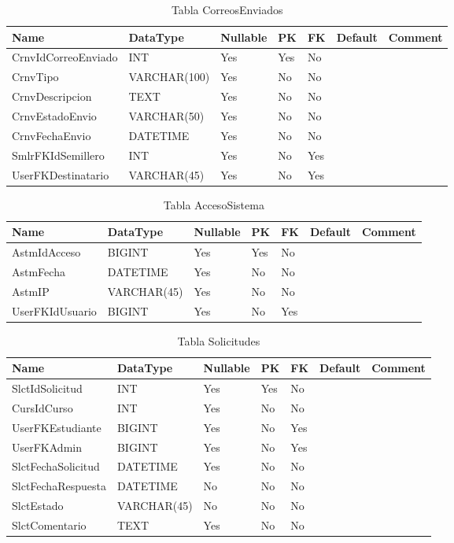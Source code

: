 \begin{table}
	\caption{Tabla CorreosEnviados}
	\label{labelTableCorreosEnviados}
	\begin{tabular}{ |l|l|l|l|l|l|l| }
		\hline
		Name & DataType & Nullable & PK & FK & Default & Comment \\ \hline
		CrnvIdCorreoEnviado & INT & Yes & Yes & No &  & \\ \hline 
		CrnvTipo & VARCHAR(100) & Yes & No & No &  & \\ \hline 
		CrnvDescripcion & TEXT & Yes & No & No &  & \\ \hline 
		CrnvEstadoEnvio & VARCHAR(50) & Yes & No & No &  & \\ \hline 
		CrnvFechaEnvio & DATETIME & Yes & No & No &  & \\ \hline 
		SmlrFKIdSemillero & INT & Yes & No & Yes &  & \\ \hline 
		UserFKDestinatario & VARCHAR(45) & Yes & No & Yes &  & \\ \hline 
		
	\end{tabular}
\end{table}


\begin{table}
	\caption{Tabla AccesoSistema}
	\label{labelTableAccesoSistema}
	\begin{tabular}{ |l|l|l|l|l|l|l| }
		\hline
		Name & DataType & Nullable & PK & FK & Default & Comment \\ \hline
		AstmIdAcceso & BIGINT & Yes & Yes & No &  & \\ \hline 
		AstmFecha & DATETIME & Yes & No & No &  & \\ \hline 
		AstmIP & VARCHAR(45) & Yes & No & No &  & \\ \hline 
		UserFKIdUsuario & BIGINT & Yes & No & Yes &  & \\ \hline 
		
	\end{tabular}
\end{table}


\begin{table}
	\caption{Tabla Solicitudes}
	\label{labelTableSolicitudes}
	\begin{tabular}{ |l|l|l|l|l|l|l| }
		\hline
		Name & DataType & Nullable & PK & FK & Default & Comment \\ \hline
		SlctIdSolicitud & INT & Yes & Yes & No &  & \\ \hline 
		CursIdCurso & INT & Yes & No & No &  & \\ \hline 
		UserFKEstudiante & BIGINT & Yes & No & Yes &  & \\ \hline 
		UserFKAdmin & BIGINT & Yes & No & Yes &  & \\ \hline 
		SlctFechaSolicitud & DATETIME & Yes & No & No &  & \\ \hline 
		SlctFechaRespuesta & DATETIME & No & No & No &  & \\ \hline 
		SlctEstado & VARCHAR(45) & No & No & No &  & \\ \hline 
		SlctComentario & TEXT & Yes & No & No &  & \\ \hline 
		
	\end{tabular}
\end{table}


